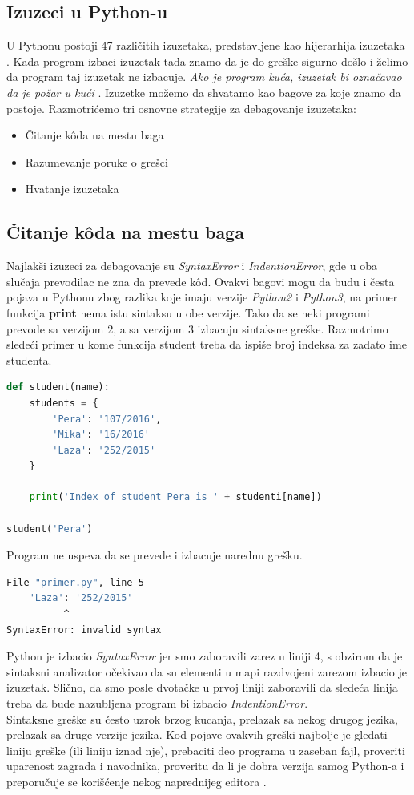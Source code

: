 \documentclass[a4paper]{article}
\begin{document}
\subsection{Izuzeci u Python-u}
U Pythonu postoji 47 različitih izuzetaka, predstavljene kao hijerarhija izuzetaka \cite{excDocPyt}. Kada program izbaci izuzetak tada znamo da je do greške sigurno došlo i želimo da program taj izuzetak ne izbacuje. \emph{Ako je program kuća, izuzetak bi označavao da je požar u kući} \cite{proPyDeb}. Izuzetke možemo da shvatamo kao bagove za koje znamo da postoje. Razmotrićemo tri osnovne strategije za debagovanje izuzetaka:
\begin{itemize}
\item Čitanje k\^{o}da na mestu baga
\item Razumevanje poruke o grešci
\item Hvatanje izuzetaka
\end{itemize}
\subsection{Čitanje k\^{o}da na mestu baga}
Najlakši izuzeci za debagovanje su \emph{SyntaxError} i \emph{IndentionError}, gde u oba slučaja prevodilac ne zna da prevede k\^{o}d. Ovakvi bagovi mogu da budu i česta pojava u Pythonu zbog razlika koje imaju verzije \emph{Python2} i \emph{Python3}, na primer funkcija \textbf{print} nema istu sintaksu u obe verzije. Tako da se neki programi prevode sa verzijom 2, a sa verzijom 3 izbacuju sintaksne greške. Razmotrimo sledeći primer u kome funkcija student treba da ispiše broj indeksa za zadato ime studenta.
\begin{lstlisting}[language = Python, caption={Funkcija student ispisuje broj indeksa za zadato ime studenta}]
def student(name):
    students = {
        'Pera': '107/2016',
        'Mika': '16/2016'
        'Laza': '252/2015'
    }

    print('Index of student Pera is ' + studenti[name])

student('Pera')
\end{lstlisting}
Program ne uspeva da se prevede i izbacuje narednu grešku.
\begin{lstlisting}[language = bash, caption={Ispis iz konzole za prethodni primer}]
  File "primer.py", line 5
    'Laza': '252/2015'
          ^
SyntaxError: invalid syntax
\end{lstlisting}
Python je izbacio \emph{SyntaxError} jer smo zaboravili zarez u liniji 4, s obzirom da je sintaksni analizator očekivao da su elementi u mapi razdvojeni zarezom izbacio je izuzetak. Slično, da smo posle dvotačke u prvoj liniji zaboravili da sledeća linija treba da bude nazubljena program bi izbacio \emph{IndentionError}.\\
Sintaksne greške su često uzrok brzog kucanja, prelazak sa nekog drugog jezika, prelazak sa druge verzije jezika. Kod pojave ovakvih greški najbolje je gledati liniju greške (ili liniju iznad nje), prebaciti deo programa u zaseban fajl, proveriti uparenost zagrada i navodnika, proveritu da li je dobra verzija samog Python-a i preporučuje se korišćenje nekog naprednijeg editora \cite{proPyDeb}.
\end{document}
